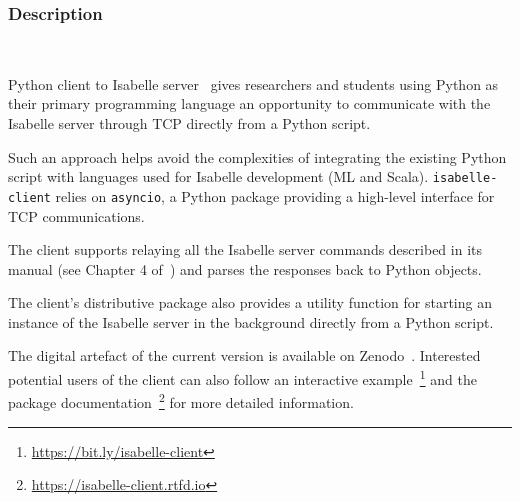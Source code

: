 

\maketool

\subsubsection{Description}~

Python client to Isabelle server~\cite{IsabelleServer} gives researchers and students using Python as their primary programming language an opportunity to communicate with the Isabelle server through TCP directly from a Python script.

Such an approach helps avoid the complexities of integrating the existing Python script with languages used for Isabelle development (ML and Scala). \texttt{isabelle-client} relies on \texttt{asyncio}, a Python package providing a high-level interface for TCP communications.

The client supports relaying all the Isabelle server commands described in its manual (see Chapter 4 of~\cite{isabelle_system_manual}) and parses the responses back to Python objects.

The client's distributive package also provides a utility function for starting an instance of the Isabelle server in the background directly from a Python script.

The digital artefact of the current version is available on Zenodo~\cite{boris_shminke_2022_6490275}. Interested potential users of the client can also follow an interactive example~\footnote{ \href{https://mybinder.org/v2/gh/inpefess/isabelle-client/HEAD?labpath=isabelle-client-examples/example.ipynb}{https://bit.ly/isabelle-client}} and the package documentation~\footnote{\href{https://isabelle-client.rtfd.io}{https://isabelle-client.rtfd.io}} for more detailed information.

